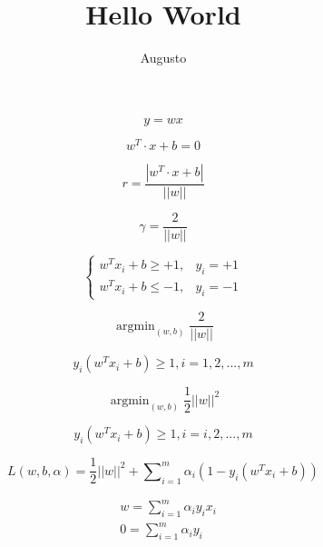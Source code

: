 \documentclass{article}
\title{Hello World}
\author {Augusto}
\begin{document}
\begin{equation}\label{wx}
  y = wx
\end{equation}

\begin{equation}\label{1}
  w^T \cdot x +b = 0
\end{equation}

\begin{equation}\label{r}
  r = \frac{\left|w^T \cdot x + b\right|}{||w||}
\end{equation}

\begin{equation}\label{gamma}
  \gamma  = \frac{2}{||w||}
\end{equation}

\begin{equation}\label{fx}
  \left\{ \begin{array}{cc}
            w^Tx_i + b \geq +1, & y_i = +1 \\
            w^Tx_i + b \leq -1, & y_i = -1
          \end{array}\right.
\end{equation}

\begin{equation}\label{tar}
  \mathop{\arg\min}_{(w,b)} \frac{2}{||w||}
\end{equation}

\begin{equation}\label{y}
  y_i(w^Tx_i + b) \geq 1, i = 1,2,...,m
\end{equation}

\begin{equation}\label{e}
  \mathop{\arg\min}_{(w,b)} \frac{1}{2}{||w||}^2
\end{equation}

\begin{equation}\label{e2}
  y_i(w^Tx_i + b) \geq 1, i = i,2,...,m
\end{equation}

\begin{equation}\label{dual}
  L(w,b,\alpha) = \frac{1}{2} {||w||}^2 + \sum\nolimits_{i=1}^{m}\alpha_i(1 - y_i(w^Tx_i+b))
\end{equation}

\begin{equation}\label{partialderivative}
 \begin{split}
     & w = \sum\nolimits_{i=1}^{m}\alpha_iy_ix_i \\
      & 0 = \sum\nolimits_{i=1}^{m}\alpha_iy_i
 \end{split}
\end{equation}
\end{document}
